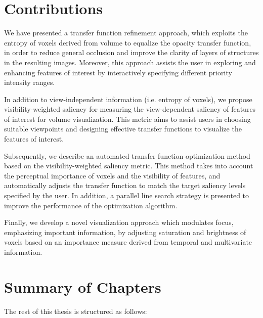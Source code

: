 
\section{Contributions}
We have presented a transfer function refinement approach, which exploits the entropy of voxels derived from volume to equalize the opacity transfer function, in order to reduce general occlusion and improve the clarity of layers of structures in the resulting images.
Moreover, this approach assists the user in exploring and enhancing features of interest by interactively specifying different priority intensity ranges.

In addition to view-independent information (i.e. entropy of voxels), we propose visibility-weighted saliency for measuring the view-dependent saliency of features of interest for volume visualization.
This metric aims to assist users in choosing suitable viewpoints and designing effective transfer functions to visualize the features of interest.

Subsequently, we describe an automated transfer function optimization method based on the visibility-weighted saliency metric. This method takes into account the perceptual importance of voxels and the visibility of features, and automatically adjusts the transfer function to match the target saliency levels specified by the user. In addition, a parallel line search strategy is presented to improve the performance of the optimization algorithm.

Finally, we develop a novel visualization approach which modulates focus, emphasizing important information, by adjusting saturation and brightness of voxels based on an importance measure derived from temporal and multivariate information.

\section{Summary of Chapters}
The rest of this thesis is structured as follows:

